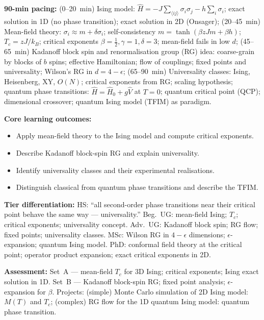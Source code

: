 \documentclass[11pt,a4paper]{article}
\begin{document}
\medskip

\begin{tcolorbox}[modulebox, title={Module~II.7 / L09: Phase Transitions II --- Ising Model and Renormalisation Group}]
\textbf{90-min pacing:} (0--20~min) Ising model: $\hat{H}=-J\sum_{\langle ij\rangle}\sigma_i\sigma_j-h\sum_i\sigma_i$; exact solution in 1D (no phase transition); exact solution in 2D (Onsager); (20--45~min) Mean-field theory: $\sigma_i\approx m+\delta\sigma_i$; self-consistency $m=\tanh(\beta zJm+\beta h)$; $T_c=zJ/k_B$; critical exponents $\beta=\tfrac{1}{2},\gamma=1,\delta=3$; mean-field fails in low $d$; (45--65~min) Kadanoff block spin and renormalisation group (RG) idea: coarse-grain by blocks of $b$ spins; effective Hamiltonian; flow of couplings; fixed points and universality; Wilson's RG in $d=4-\epsilon$; (65--90~min) Universality classes: Ising, Heisenberg, XY, $O(N)$; critical exponents from RG; scaling hypothesis; quantum phase transitions: $\hat{H}=\hat{H}_0+g\hat{V}$ at $T=0$; quantum critical point (QCP); dimensional crossover; quantum Ising model (TFIM) as paradigm.

\medskip\textbf{Core learning outcomes:}
\begin{itemize}[leftmargin=1.4em,topsep=2pt,itemsep=1pt]
  \item Apply mean-field theory to the Ising model and compute critical exponents.
  \item Describe Kadanoff block-spin RG and explain universality.
  \item Identify universality classes and their experimental realisations.
  \item Distinguish classical from quantum phase transitions and describe the TFIM.
\end{itemize}

\medskip\textbf{Tier differentiation:}
HS: ``all second-order phase transitions near their critical point behave the same way --- universality.''
Beg.\ UG: mean-field Ising; $T_c$; critical exponents; universality concept.
Adv.\ UG: Kadanoff block spin; RG flow; fixed points; universality classes.
MSc: Wilson RG in $4-\epsilon$ dimensions; $\epsilon$-expansion; quantum Ising model.
PhD: conformal field theory at the critical point; operator product expansion; exact critical exponents in 2D.

\medskip\textbf{Assessment:}
Set~A --- mean-field $T_c$ for 3D Ising; critical exponents; Ising exact solution in 1D.
Set~B --- Kadanoff block-spin RG; fixed point analysis; $\epsilon$-expansion for $\beta$.
Projects: (simple) Monte Carlo simulation of 2D Ising model: $M(T)$ and $T_c$;
(complex) RG flow for the 1D quantum Ising model: quantum phase transition.
\end{tcolorbox}
\end{document}
